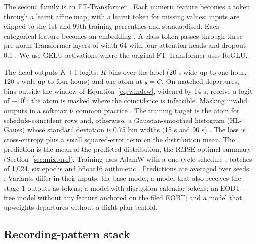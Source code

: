 \documentclass[
  manuscript=article,  %
  layout=preprint,  %
  year=20xx,
  volume=x,
]{extra/joas}
\begin{document}
The second family is an FT-Transformer \cite{gorishniy2021revisiting}. Each numeric feature becomes a token through a learnt affine map, with a learnt token for missing values; inputs are clipped to the 1st and 99th training percentiles and standardised. Each categorical feature becomes an embedding \cite{guo2016entity}. A class token passes through three pre-norm Transformer layers \cite{vaswani2017attention,xiong2020layer} of width 64 with four attention heads and dropout 0.1 \cite{srivastava2014dropout}. We use GELU activations \cite{hendrycks2016gaussian} where the original FT-Transformer uses ReGLU.

The head outputs $K+1$ logits: $K$ bins over the label (20 s wide up to one hour, 120 s wide up to four hours) and one atom at $y = C$. On matched departures, bins outside the window of Equation~\eqref{eq:window}, widened by 14 s, receive a logit of $-10^9$; the atom is masked where the coincidence is infeasible. Masking invalid outputs in a softmax is common practice \cite{huang2022closer}. The training target is the atom for schedule-coincident rows and, otherwise, a Gaussian-smoothed histogram (HL-Gauss) whose standard deviation is 0.75 bin widths (15 s and 90 s) \cite{imani2018improving,farebrother2024stop}. The loss is cross-entropy plus a small squared-error term on the distribution mean. The prediction is the mean of the predicted distribution, the RMSE-optimal summary (Section~\ref{sec:mixture}). Training uses AdamW \cite{loshchilov2019decoupled} with a one-cycle schedule \cite{smith2019superconvergence}, batches of 1,024, six epochs and bfloat16 arithmetic \cite{kalamkar2019study}. Predictions are averaged over seeds \cite{lakshminarayanan2017simple}. Variants differ in their inputs: the base model; a model that also receives the stage-1 outputs as tokens; a model with disruption-calendar tokens; an EOBT-free model without any feature anchored on the filed EOBT; and a model that upweights departures without a flight plan tenfold.

\subsection{Recording-pattern stack}
\label{sec:stack}
\end{document}
